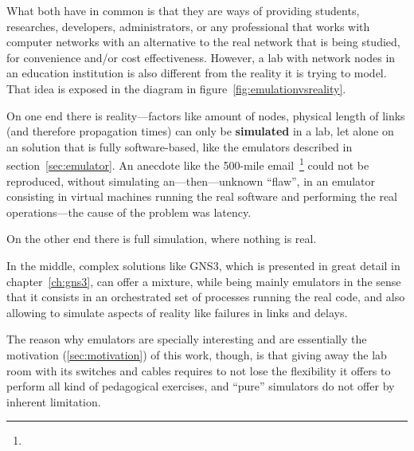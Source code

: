 What both have in common is that they are ways of providing students, researches, developers, administrators, or any professional that works with computer networks with an alternative to the real network that is being studied, for convenience and/or cost effectiveness. However, a lab with network nodes in an education institution is also different from the reality it is trying to model. That idea is exposed in the diagram in figure~\ref{fig:emulationvsreality}.

On one end there is reality---factors like amount of nodes, physical length of links (and therefore propagation times) can only be \textbf{simulated} in a lab, let alone on an solution that is fully software-based, like the emulators described in section~\ref{sec:emulator}. An anecdote like the 500-mile email~\footnote{} could not be reproduced, without simulating an---then---unknown ``flaw'', in an emulator consisting in virtual machines running the real software and performing the real operations---the cause of the problem was latency.

On the other end there is full simulation, where nothing is real.

In the middle, complex solutions like GNS3, which is presented in great detail in chapter~\ref{ch:gns3}, can offer a mixture, while being mainly emulators in the sense that it consists in an orchestrated set of processes running the real code, and also allowing to simulate aspects of reality like failures in links and delays.

The reason why emulators are specially interesting and are essentially the motivation (\ref{sec:motivation}) of this work, though, is that giving away the lab room with its switches and cables requires to not lose the flexibility it offers to perform all kind of pedagogical exercises, and ``pure'' simulators do not offer by inherent limitation.
